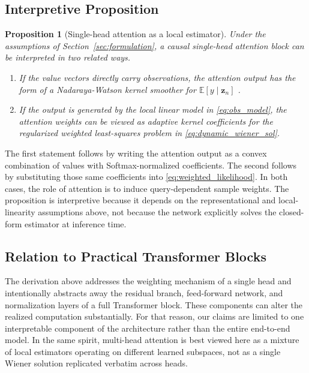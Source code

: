 \documentclass[conference]{IEEEtran}
\begin{document}
\subsection{Interpretive Proposition}
\newtheorem{proposition}{Proposition}
\begin{proposition}[Single-head attention as a local estimator]
Under the assumptions of Section~\ref{sec:formulation}, a causal single-head attention block can be interpreted in two related ways.
\begin{enumerate}
    \item If the value vectors directly carry observations, the attention output has the form of a Nadaraya-Watson kernel smoother for $\mathbb{E}[y \mid \mathbf{z}_n]$ \cite{nadaraya1964, watson1964}.
    \item If the output is generated by the local linear model in \eqref{eq:obs_model}, the attention weights can be viewed as adaptive kernel coefficients for the regularized weighted least-squares problem in \eqref{eq:dynamic_wiener_sol}.
\end{enumerate}
\end{proposition}

\begin{IEEEproof}
The first statement follows by writing the attention output as a convex combination of values with Softmax-normalized coefficients. The second follows by substituting those same coefficients into \eqref{eq:weighted_likelihood}. In both cases, the role of attention is to induce query-dependent sample weights. The proposition is interpretive because it depends on the representational and local-linearity assumptions above, not because the network explicitly solves the closed-form estimator at inference time.
\end{IEEEproof}

\subsection{Relation to Practical Transformer Blocks}
The derivation above addresses the weighting mechanism of a single head and intentionally abstracts away the residual branch, feed-forward network, and normalization layers of a full Transformer block. These components can alter the realized computation substantially. For that reason, our claims are limited to one interpretable component of the architecture rather than the entire end-to-end model. In the same spirit, multi-head attention is best viewed here as a mixture of local estimators operating on different learned subspaces, not as a single Wiener solution replicated verbatim across heads.
\end{document}

